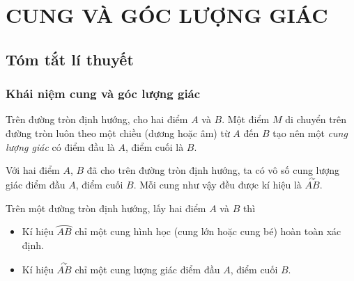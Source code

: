 \section{CUNG VÀ GÓC LƯỢNG GIÁC}

\subsection{Tóm tắt lí thuyết}
\subsubsection{Khái niệm cung và góc lượng giác}
\begin{dn}
\end{dn}

\begin{dn}
Trên đường tròn định hướng, cho hai điểm $A$ và $B$. Một điểm $M$ di chuyển trên đường tròn luôn theo một chiều (dương hoặc âm) từ $A$ đến $B$ tạo nên một \textit{cung lượng giác} có điểm đầu là $A$, điểm cuối là $B$.
\end{dn}

\begin{note}
Với hai điểm $A$, $B$ đã cho trên đường tròn định hướng, ta có vô số cung lượng giác điểm đầu $A$, điểm cuối $B$. Mỗi cung như vậy đều được kí hiệu là $\overset{\curvearrowright}{AB}$.
\end{note}

\begin{note}
Trên một đường tròn định hướng, lấy hai điểm $A$ và $B$ thì 
\begin{itemize}
\item Kí hiệu $\wideparen{AB}$ chỉ một cung hình học (cung lớn hoặc cung bé) hoàn toàn xác định.
\item Kí hiệu $\overset{\curvearrowright}{AB}$ chỉ một cung lượng giác điểm đầu $A$, điểm cuối $B$.
\end{itemize}
\end{note}

